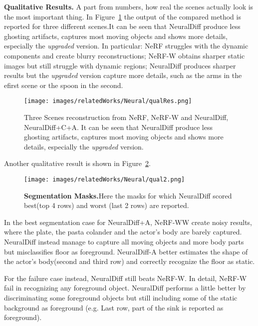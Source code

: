 \textbf{Qualitative Results.} A part from numbers, how real the scenes actually look
is the most important thing. In Figure~\ref{fig:ndiff_qualitative} the output of the compared
method is reported for three different scenes.It can be seen that NeuralDiff produce less ghosting artifacts, captures most moving
objects and shows more details, especially the \textit{upgraded} version. In particular: NeRF struggles
with the dynamic components and create blurry reconstructions; NeRF-W obtains sharper static images 
but still struggle with dynamic regions; NeuralDiff produces sharper results but the \textit{upgraded}
version capture more details, such as the arms in the efirst scene or the spoon in the second.
\begin{figure}
    \centering
    \texttt{[image: images/relatedWorks/Neural/qualRes.png]} 
    \caption{Three Scenes reconstruction from NeRF, NeRF-W and NeuralDiff, NeuralDiff+C+A.
     It can be seen that NeuralDiff produce less ghosting artifacts, captures most moving
     objects and shows more details, especially the \textit{upgraded} version.}\label{fig:ndiff_qualitative}
\end{figure}
Another qualitative result is shown in Figure~\ref{fig:qual2}.
\begin{figure}
    \centering
    \texttt{[image: images/relatedWorks/Neural/qual2.png]} 
    \caption{\textbf{Segmentation Masks.}Here the masks for which NeuralDiff scored best(top 4 rows)
    and worst (last 2 rows) are reported.}\label{fig:qual2}
\end{figure}
In the best segmentation case for NeuralDiff+A, NeRF-WW create noisy results, where 
the plate, the pasta colander and the actor's body are barely captured. NeuralDiff 
instead manage to capture all moving objects and more body parts but misclassifies 
floor as foreground. NeuralDiff-A better estimates the shape of the actor's body(second and third row)
and correctly recognize the floor as static.

For the failure case instead, NeuralDiff still beats NeRF-W. In detail, NeRF-W fail 
in recognizing any foreground object. NeuralDiff performs a little better by discriminating
some foreground objects but still including some of the static background as foreground
(e.g. Last row, part of the sink is reported as foreground).